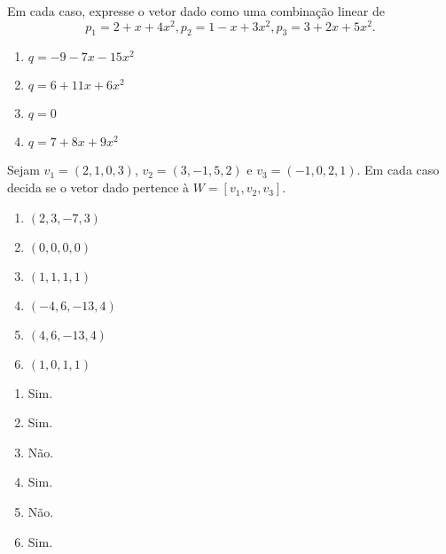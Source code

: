 \documentclass[12pt]{exam}
\begin{document}
\begin{exercicio}
    Em cada caso, expresse o vetor dado como uma combinação linear de
    \[
        p_1 = 2 + x + 4x^2,
        p_2 = 1 - x + 3x^2,
        p_3 = 3 + 2x + 5x^2.
    \]
    \begin{multicols}{2}
        \begin{enumerate}[label={\alph*})]
            \item $q = -9 -7x - 15x^2$

            \item $q = 6 + 11x + 6x^2$

            \item $q = 0$

            \item $q = 7 + 8x + 9x^2$
        \end{enumerate}
    \end{multicols}
\end{exercicio}

\begin{exercicio}
    Sejam $v_1 = (2, 1, 0, 3)$, $v_2 = (3, -1, 5, 2)$ e $v_3 = (-1, 0, 2, 1)$. Em cada caso decida se o vetor dado pertence à $W = [v_1, v_2, v_3]$.
    \begin{multicols}{2}
        \begin{enumerate}[label={\alph*})]
            \item $(2, 3, -7, 3)$

            \item $(0, 0, 0, 0)$

            \item $(1, 1, 1, 1)$

            \item $(-4, 6, -13, 4)$

            \item $(4, 6, -13, 4)$

            \item $(1, 0, 1, 1)$
        \end{enumerate}
    \end{multicols}
    \begin{solucao}
    	\begin{enumerate}
    		\item Sim.

    		\item Sim.

    		\item Não.

    		\item Sim.

    		\item Não.

    		\item Sim.
    	\end{enumerate}
    \end{solucao}
\end{exercicio}
\end{document}
